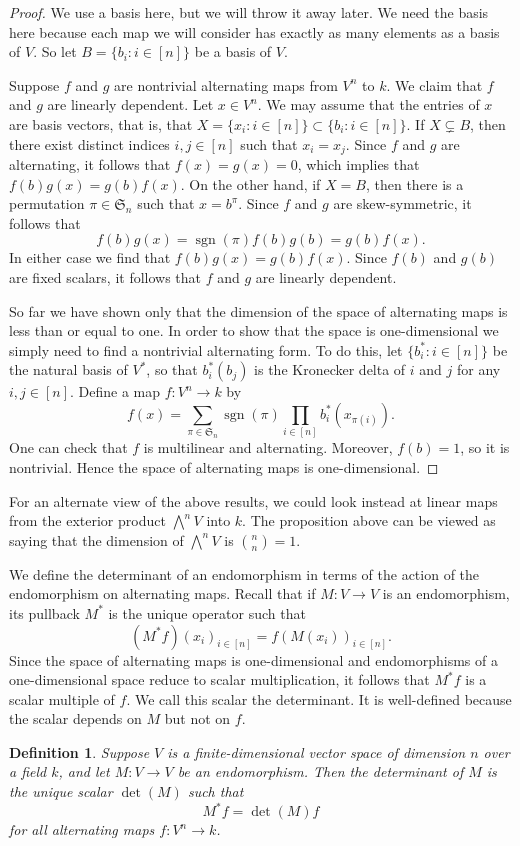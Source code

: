 \documentclass[12pt]{article}
\DeclareMathOperator{\sgn}{sgn}
\newtheorem*{definition*}{Definition}
\begin{document}
\begin{proof}
We use a basis here, but we will throw it away later.  We need the
basis here because each map we will consider has exactly as many
elements as a basis of $V$.  So let $B = \{b_i\colon i\in[n]\}$ be a
basis of $V$.

Suppose $f$ and $g$ are nontrivial alternating maps from $V^n$ to $k$.
We claim that $f$ and $g$ are linearly dependent.  Let $x\in V^n$.  We
may assume that the entries of $x$ are basis vectors, that is, that $X
= \{x_i\colon i\in[n]\}\subset\{b_i\colon i\in[n]\}$.  
If $X\subsetneq B$, then there exist distinct indices $i,j\in[n]$ such
that $x_i = x_j$.  Since $f$ and $g$ are alternating, it follows that
$f(x) = g(x) = 0$, which implies that $f(b)g(x) = g(b)f(x)$.
On the other hand, if $X = B$, then there is a permutation
$\pi\in\mathfrak{S}_n$ such that $x = b^{\pi}$.  Since $f$ and $g$ are
skew-symmetric, it follows that
\[
f(b)g(x) = \sgn(\pi)f(b)g(b) = g(b)f(x).
\]
In either case we find that $f(b) g(x) = g(b) f(x)$.  Since $f(b)$ and
$g(b)$ are fixed scalars, it follows that $f$ and $g$ are linearly
dependent.

So far we have shown only that the dimension of the space of
alternating maps is less than or equal to one.  In order to show that
the space is one-dimensional we simply need to find a nontrivial
alternating form.  To do this, let $\{b^*_i\colon i\in[n]\}$ be the
natural basis of $V^*$, so that $b^*_i(b_j)$ is the Kronecker delta of
$i$ and $j$ for any $i,j\in[n]$.  Define a map $f\colon V^n\to k$ by
\[
f(x) = \sum_{\pi\in\mathfrak{S}_n} \sgn(\pi)\prod_{i\in[n]} b^*_i(x_{\pi(i)}).
\]
One can check that $f$ is multilinear and alternating.  Moreover,
$f(b) = 1$, so it is nontrivial.  Hence the space of alternating maps
is one-dimensional.
\end{proof}

For an alternate view of the above results, we could look instead at
linear maps from the exterior product $\bigwedge^n V$ into $k$.  The
proposition above can be viewed as saying that the dimension of
$\bigwedge^n V$ is $\displaystyle\binom{n}{n} = 1$.

We define the determinant of an endomorphism in terms of the action of
the endomorphism on alternating maps.  Recall that if $M\colon V\to V$
is an endomorphism, its pullback $M^*$ is the unique operator such
that
\[
(M^*f)(x_i)_{i\in [n]} = f(M(x_i))_{i\in [n]}.
\]
Since the space of alternating maps is one-dimensional and
endomorphisms of a one-dimensional space reduce to scalar
multiplication, it follows that $M^*f$ is a scalar multiple of $f$.
We call this scalar the determinant.  It is well-defined because the
scalar depends on $M$ but not on $f$.

\begin{definition*}
Suppose $V$ is a finite-dimensional vector space of dimension $n$ over
a field $k$, and let $M\colon V\to V$ be an endomorphism.  Then the
\emph{determinant} of $M$ is the unique scalar $\det(M)$ such that 
\[
M^* f = \det(M) f
\]
for all alternating maps $f\colon V^n\to k$.
\end{definition*}

\end{document}
